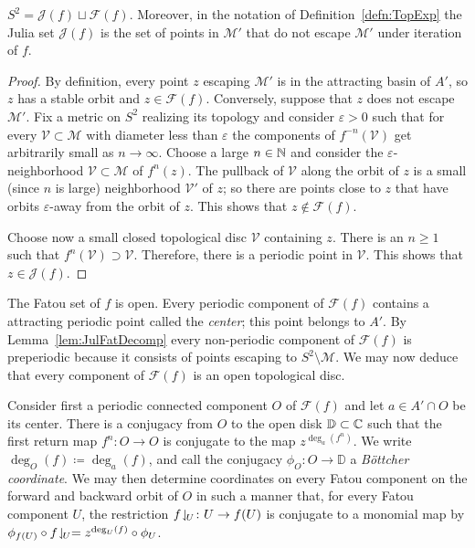 \documentclass{amsart}
\newcommand\Fatou{{\mathcal F}}
\newcommand\Julia{{\mathcal J}}
\begin{document}
\begin{lem}\label{lem:JulFatDecomp}
  $S^2=\Julia(f)\sqcup\Fatou(f)$. Moreover, in the notation of
  Definition~\ref{defn:TopExp} the Julia set $\Julia(f)$ is the set of
  points in $\mathcal M'$ that do not escape $\mathcal M'$ under iteration of $f$.
\end{lem}
\begin{proof}
  By definition, every point $z$ escaping $\mathcal M'$ is in the attracting
  basin of $A'$, so $z$ has a stable orbit and $z\in
  \Fatou(f)$. Conversely, suppose that $z$ does not escape $\mathcal M'$. Fix a
  metric on $S^2$ realizing its topology and consider $\varepsilon>0$
  such that for every $\mathcal V\subset \mathcal M$ with diameter less than
  $\varepsilon$ the components of $f^{-n}(\mathcal V)$ get arbitrarily
  small as $n\to\infty$. Choose a large $n\in {\mathbb N}$ and consider the
  $\varepsilon$-neighborhood $\mathcal V\subset \mathcal M$ of $f^{n}(z)$. The
  pullback of $\mathcal V$ along the orbit of $z$ is a small (since
  $n$ is large) neighborhood $\mathcal V'$ of $z$; so there are points
  close to $z$ that have orbits $\varepsilon$-away from the orbit of
  $z$.  This shows that $z\not\in\mathcal F(f)$.

  Choose now a small closed topological disc $\mathcal V$ containing
  $z$. There is an $n\ge 1$ such that
  $f^n(\mathcal V) \supset \mathcal V$. Therefore, there is a periodic
  point in $\mathcal V$. This shows that $z\in\Julia(f)$.
\end{proof}

The Fatou set of $f$ is open. Every periodic component of
$\mathcal F(f)$ contains a attracting periodic point called the
\emph{center}; this point belongs to $A'$. By
Lemma~\ref{lem:JulFatDecomp} every non-periodic component of
$\mathcal F(f)$ is preperiodic because it consists of points escaping
to $S^2\setminus \mathcal M$. We may now deduce that every component of
$\mathcal F(f)$ is an open topological disc.

Consider first a periodic connected component $O$ of $\Fatou(f)$ and
let $a\in A'\cap O$ be its center. There is a conjugacy from $O$ to
the open disk $\mathbb D\subset{\mathbb C}$ such that the first return map
$f^n\colon O\to O$ is conjugate to the map $z^{\deg_a(f^n)}$. We write
$\deg_O(f)\coloneqq\deg_a(f)$, and call the conjugacy
$\phi_O\colon O\to\mathbb D$ a \emph{B\"ottcher coordinate}. We may
then determine coordinates on every Fatou component on the forward and
backward orbit of $O$ in such a manner that, for every Fatou component
$U$, the restriction $f\!\downharpoonleft_{\!U}\colon U\to f(U)$ is conjugate to a
monomial map by
$\phi_{f(U)}\circ f\!\downharpoonleft_{\!U}=z^{\deg_U(f)}\circ\phi_U$.
\end{document}
